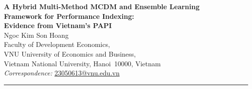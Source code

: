\documentclass[12pt, a4paper]{article}
\begin{document}
\begin{center}
  {\LARGE\bfseries A Hybrid Multi-Method MCDM and Ensemble Learning\\[4pt]
  Framework for Performance Indexing:\\[4pt]
  Evidence from Vietnam's PAPI}\\[14pt]

  {\large Ngoc Kim Son Hoang}\\[4pt]

  {\normalsize
    Faculty of Development Economics,\\
    VNU University of Economics and Business,\\
    Vietnam National University, Hanoi~10000, Vietnam\\[4pt]
    \textit{Correspondence:} \href{mailto:23050613@vnu.edu.vn}{23050613@vnu.edu.vn}
  }\\[10pt]

  \noindent\rule{\textwidth}{0.6pt}
\end{center}
\end{document}
